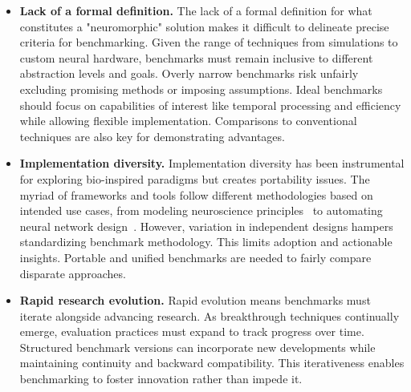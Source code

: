 \begin{itemize}
    \item \textbf{Lack of a formal definition.} The lack of a formal definition for what constitutes a "neuromorphic" solution makes it difficult to delineate precise criteria for benchmarking. Given the range of techniques from simulations to custom neural hardware, benchmarks must remain inclusive to different abstraction levels and goals. Overly narrow benchmarks risk unfairly excluding promising methods or imposing assumptions. Ideal benchmarks should focus on capabilities of interest like temporal processing and efficiency while allowing flexible implementation. Comparisons to conventional techniques are also key for demonstrating advantages.

    \item \textbf{Implementation diversity.} Implementation diversity has been instrumental for exploring bio-inspired paradigms but creates portability issues. The myriad of frameworks and tools follow different methodologies based on intended use cases, from modeling neuroscience principles~\cite{nest2007} to automating neural network design~\cite{eshraghian2021training}. However, variation in independent designs hampers standardizing benchmark methodology. This limits adoption and actionable insights. Portable and unified benchmarks are needed to fairly compare disparate approaches.

    
    \item \textbf{Rapid research evolution.} Rapid evolution means benchmarks must iterate alongside advancing research. As breakthrough techniques continually emerge, evaluation practices must expand to track progress over time. Structured benchmark versions can incorporate new developments while maintaining continuity and backward compatibility. This iterativeness enables benchmarking to foster innovation rather than impede it.
    
\end{itemize}

    

